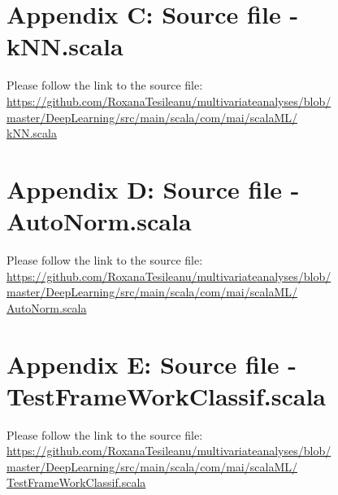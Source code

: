 \documentclass[twoside, 11 p]{article}
\begin{document}
\section*{Appendix C: Source file - kNN.scala}

Please follow the link to the source file:\\
\href{https://github.com/RoxanaTesileanu/multivariate_analyses/blob/master/DeepLearning/src/main/scala/com/mai/scalaML/kNN.scala}{https://github.com/RoxanaTesileanu/multivariate\underline{\space}analyses/blob/\\master/DeepLearning/src/main/scala/com/mai/scalaML/\\kNN.scala}

\section*{Appendix D: Source file - AutoNorm.scala}

Please follow the link to the source file:\\
\href{https://github.com/RoxanaTesileanu/multivariate_analyses/blob/master/DeepLearning/src/main/scala/com/mai/scalaML/AutoNorm.scala}{https://github.com/RoxanaTesileanu/multivariate\underline{\space}analyses/blob/\\master/DeepLearning/src/main/scala/com/mai/scalaML/\\AutoNorm.scala}

\section*{Appendix E: Source file - TestFrameWorkClassif.scala}

Please follow the link to the source file:\\
\href{https://github.com/RoxanaTesileanu/multivariate_analyses/blob/master/DeepLearning/src/main/scala/com/mai/scalaML/TestFrameWorkClassif.scala}{https://github.com/RoxanaTesileanu/multivariate\underline{\space}analyses/blob/\\master/DeepLearning/src/main/scala/com/mai/scalaML/\\TestFrameWorkClassif.scala}






\end{document}
